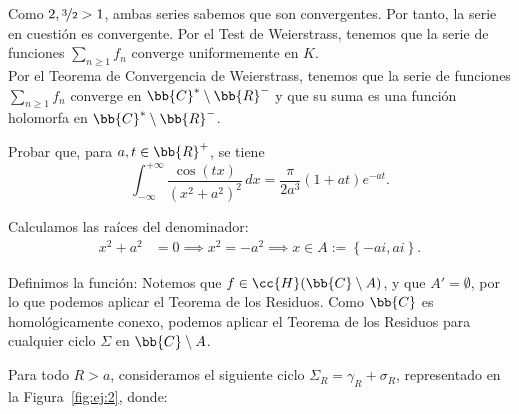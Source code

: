 \documentclass[12pt]{article}
\begin{document}
\begin{ejercicio}[2.5 puntos]
\begin{enumerate}
            Como $2,\nicefrac{3}{2}>1$, ambas series sabemos que son convergentes. Por tanto, la serie en cuestión es convergente. Por el Test de Weierstrass, tenemos que la serie de funciones $\sum\limits_{n\geq 1} f_n$ converge uniformemente en $K$.\\

            Por el Teorema de Convergencia de Weierstrass, tenemos que la serie de funciones $\sum\limits_{n\geq 1} f_n$ converge en $\bb{C}^* \setminus \bb{R}^-$ y que su suma es una función holomorfa en $\bb{C}^* \setminus \bb{R}^-$.
        \end{enumerate}
    \end{ejercicio}

    \begin{ejercicio}[2.5 puntos]\label{ej:2}
        Probar que, para $a, t \in \bb{R}^+$, se tiene
        \[
            \int_{-\infty}^{+\infty} \frac{\cos(tx)}{(x^2 + a^2)^2} \, dx = \frac{\pi}{2a^3} (1 + at) e^{-at}.
        \]

        Calculamos las raíces del denominador:
        \begin{align*}
            x^2 + a^2 &= 0 \implies x^2 = -a^2 \implies x\in A:=\left\{-ai, ai\right\}.
        \end{align*}

        Definimos la función:
        Notemos que $f\in \cc{H}(\bb{C}\setminus A)$, y que $A'=\emptyset$, por lo que podemos aplicar el Teorema de los Residuos. Como $\bb{C}$ es homológicamente conexo, podemos aplicar el Teorema de los Residuos para cualquier ciclo $\Sigma$ en $\bb{C}\setminus A$.

        Para todo $R > a$, consideramos el siguiente ciclo $\Sigma_R = \gamma_R + \sigma_R$, representado en la Figura~\ref{fig:ej:2}, donde:
        \begin{figure}
            \centering
\end{figure}
\end{ejercicio}
\end{document}
